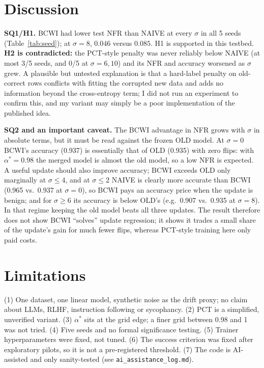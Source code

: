 \documentclass[acmsmall,screen]{acmart}
\begin{document}
\section{Discussion}
\textbf{SQ1/H1.} BCWI had lower test NFR than NAIVE at every $\sigma$ in all 5 seeds (Table~\ref{tab:seed}); at $\sigma{=}8$, $0.046$ versus $0.085$. H1 is supported in this testbed. \textbf{H2 is contradicted:} the PCT-style penalty was never reliably below NAIVE (at most 3/5 seeds, and 0/5 at $\sigma{=}6,10$) and its NFR and accuracy worsened as $\sigma$ grew. A plausible but untested explanation is that a hard-label penalty on old-correct rows conflicts with fitting the corrupted new data and adds no information beyond the cross-entropy term; I did not run an experiment to confirm this, and my variant may simply be a poor implementation of the published idea.

\textbf{SQ2 and an important caveat.} The BCWI advantage in NFR grows with $\sigma$ in absolute terms, but it must be read against the frozen OLD model. At $\sigma{=}0$ BCWI's accuracy (0.937) is essentially that of OLD (0.935) with zero flips: with $\alpha^*{=}0.98$ the merged model is almost the old model, so a low NFR is expected. A useful update should also improve accuracy; BCWI exceeds OLD only marginally at $\sigma\le 4$, and at $\sigma\le 2$ NAIVE is clearly more accurate than BCWI (0.965 vs.\ 0.937 at $\sigma{=}0$), so BCWI pays an accuracy price when the update is benign; and for $\sigma\ge6$ its accuracy is below OLD's (e.g.\ 0.907 vs.\ 0.935 at $\sigma{=}8$). In that regime keeping the old model beats all three updates. The result therefore does not show BCWI ``solves'' update regression; it shows it trades a small share of the update's gain for much fewer flips, whereas PCT-style training here only paid costs.

\section{Limitations}
(1) One dataset, one linear model, synthetic noise as the drift proxy; no claim about LLMs, RLHF, instruction following or sycophancy. (2) PCT is a simplified, unverified variant. (3) $\alpha^*$ sits at the grid edge; a finer grid between 0.98 and 1 was not tried. (4) Five seeds and no formal significance testing. (5) Trainer hyperparameters were fixed, not tuned. (6) The success criterion was fixed after exploratory pilots, so it is not a pre-registered threshold. (7) The code is AI-assisted and only sanity-tested (see \texttt{ai\_assistance\_log.md}).
\end{document}
